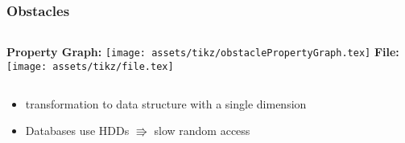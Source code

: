 \begin{frame}
    \frametitle{Obstacles}

    \begin{columns}

        \textbf{Property Graph:}
        \vfill
        \centering
        \texttt{[image: assets/tikz/obstaclePropertyGraph.tex]}
        \textbf{File:}\\
        \vfill
        \centering
        \texttt{[image: assets/tikz/file.tex]}
    \end{columns}
    \vfill
    \begin{itemize}
        \item transformation to data structure with a single dimension
        \item Databases use HDDs $\Rrightarrow$ slow random access
    \end{itemize}

    
\end{frame}